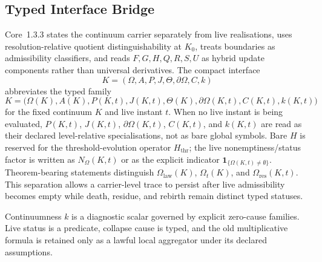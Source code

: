 
\subsection{Typed Interface Bridge}
\label{sec:oc133-model-scientific-closure-bridge}

Core~1.3.3 states the continuum carrier separately from live realisations,
uses resolution-relative quotient distinguishability at \(K_0\), treats
boundaries as admissibility classifiers, and reads \(F,G,H,Q,R,S,U\) as
hybrid update components rather than universal derivatives.  The compact
interface
\[
K=(\Omega,A,P,J,\Theta,\partial\Omega,C,k)
\]
abbreviates the typed family
\[
K=\big(\Omega(K),A(K),P(K,t),J(K,t),\Theta(K),
       \partial\Omega(K,t),C(K,t),k(K,t)\big)
\]
for the fixed continuum \(K\) and live instant \(t\).  When no live instant is
being evaluated, \(P(K,t)\), \(J(K,t)\), \(\partial\Omega(K,t)\), \(C(K,t)\),
and \(k(K,t)\) are read as their declared level-relative specialisations, not
as bare global symbols.  Bare \(H\) is reserved for the threshold-evolution
operator \(H_{\mathrm{thr}}\); the live nonemptiness/status factor is written as
\(N_{\Omega}(K,t)\) or as the explicit indicator
\(\mathbf{1}_{\{\Omega(K,t)\neq\emptyset\}}\).  Theorem-bearing statements distinguish
\(\Omega_{\mathrm{law}}(K)\), \(\Omega_t(K)\), and
\(\Omega_{\mathrm{res}}(K,t)\).  This separation allows a carrier-level trace
to persist after live admissibility becomes empty while death, residue, and
rebirth remain distinct typed statuses.

Continuumness \(k\) is a diagnostic scalar governed by explicit zero-cause
families.  Live status is a predicate, collapse cause is typed, and the old
multiplicative formula is retained only as a lawful local aggregator under its
declared assumptions.
